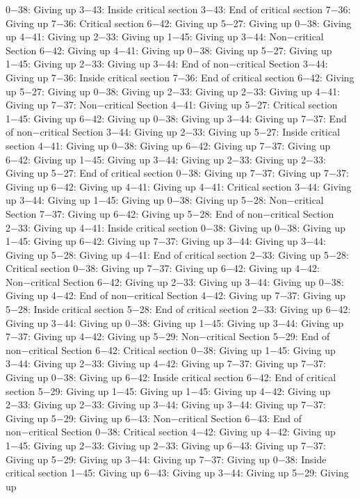 0−38: Giving up
3−43: Inside critical section
3−43: End of critical section
7−36: Giving up
7−36: Critical section
6−42: Giving up
5−27: Giving up
0−38: Giving up
4−41: Giving up
2−33: Giving up
1−45: Giving up
3−44: Non−critical Section
6−42: Giving up
4−41: Giving up
0−38: Giving up
5−27: Giving up
1−45: Giving up
2−33: Giving up
3−44: End of non−critical Section
3−44: Giving up
7−36: Inside critical section
7−36: End of critical section
6−42: Giving up
5−27: Giving up
0−38: Giving up
2−33: Giving up
2−33: Giving up
4−41: Giving up
7−37: Non−critical Section
4−41: Giving up
5−27: Critical section
1−45: Giving up
6−42: Giving up
0−38: Giving up
3−44: Giving up
7−37: End of non−critical Section
3−44: Giving up
2−33: Giving up
5−27: Inside critical section
4−41: Giving up
0−38: Giving up
6−42: Giving up
7−37: Giving up
6−42: Giving up
1−45: Giving up
3−44: Giving up
2−33: Giving up
2−33: Giving up
5−27: End of critical section
0−38: Giving up
7−37: Giving up
7−37: Giving up
6−42: Giving up
4−41: Giving up
4−41: Critical section
3−44: Giving up
3−44: Giving up
1−45: Giving up
0−38: Giving up
5−28: Non−critical Section
7−37: Giving up
6−42: Giving up
5−28: End of non−critical Section
2−33: Giving up
4−41: Inside critical section
0−38: Giving up
0−38: Giving up
1−45: Giving up
6−42: Giving up
7−37: Giving up
3−44: Giving up
3−44: Giving up
5−28: Giving up
4−41: End of critical section
2−33: Giving up
5−28: Critical section
0−38: Giving up
7−37: Giving up
6−42: Giving up
4−42: Non−critical Section
6−42: Giving up
2−33: Giving up
3−44: Giving up
0−38: Giving up
4−42: End of non−critical Section
4−42: Giving up
7−37: Giving up
5−28: Inside critical section
5−28: End of critical section
2−33: Giving up
6−42: Giving up
3−44: Giving up
0−38: Giving up
1−45: Giving up
3−44: Giving up
7−37: Giving up
4−42: Giving up
5−29: Non−critical Section
5−29: End of non−critical Section
6−42: Critical section
0−38: Giving up
1−45: Giving up
3−44: Giving up
2−33: Giving up
4−42: Giving up
7−37: Giving up
7−37: Giving up
0−38: Giving up
6−42: Inside critical section
6−42: End of critical section
5−29: Giving up
1−45: Giving up
1−45: Giving up
4−42: Giving up
2−33: Giving up
2−33: Giving up
3−44: Giving up
3−44: Giving up
7−37: Giving up
5−29: Giving up
6−43: Non−critical Section
6−43: End of non−critical Section
0−38: Critical section
4−42: Giving up
4−42: Giving up
1−45: Giving up
2−33: Giving up
2−33: Giving up
6−43: Giving up
7−37: Giving up
5−29: Giving up
3−44: Giving up
7−37: Giving up
0−38: Inside critical section
1−45: Giving up
6−43: Giving up
3−44: Giving up
5−29: Giving up

